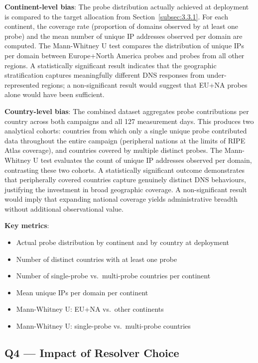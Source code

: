 \textbf{Continent-level bias}: The probe distribution actually achieved at deployment is compared to the target allocation from Section~\ref{subsec:3.3.1}. For each continent, the coverage rate (proportion of domains observed by at least one probe) and the mean number of unique \ac{IP} addresses observed per domain are computed. The Mann-Whitney U test compares the distribution of unique \ac{IP}s per domain between Europe+North America probes and probes from all other regions. A statistically significant result indicates that the geographic stratification captures meaningfully different \ac{DNS} responses from under-represented regions; a non-significant result would suggest that EU+NA probes alone would have been sufficient.

\textbf{Country-level bias}: The combined dataset aggregates probe contributions per country across both campaigns and all 127 measurement days. This produces two analytical cohorts: countries from which only a single unique probe contributed data throughout the entire campaign (peripheral nations at the limits of RIPE Atlas coverage), and countries covered by multiple distinct probes. The Mann-Whitney U test evaluates the count of unique \ac{IP} addresses observed per domain, contrasting these two cohorts. A statistically significant outcome demonstrates that peripherally covered countries capture genuinely distinct \ac{DNS} behaviours, justifying the investment in broad geographic coverage. A non-significant result would imply that expanding national coverage yields administrative breadth without additional observational value.

\textbf{Key metrics}:
\begin{itemize}
  \item Actual probe distribution by continent and by country at deployment
  \item Number of distinct countries with at least one probe
  \item Number of single-probe vs.\ multi-probe countries per continent
  \item Mean unique \ac{IP}s per domain per continent
  \item Mann-Whitney U: EU+NA vs.\ other continents
  \item Mann-Whitney U: single-probe vs.\ multi-probe countries
\end{itemize}

\subsection{Q4 --- Impact of Resolver Choice}
\label{subsec:3.5.5}

